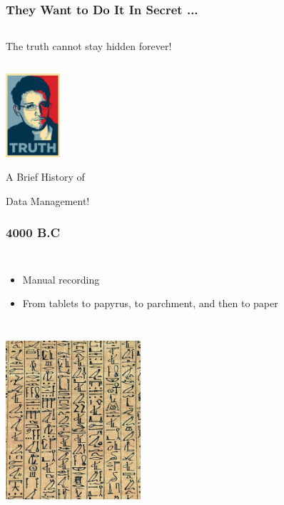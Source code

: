 \documentclass{beamer}
\begin{document}
\begin{frame}
\frametitle{They Want to Do It In Secret ...}
\begin{columns}
\column{17em}
\vspace{2cm}
\begin{block}{}
\centering
The truth cannot stay hidden forever!
\end{block}
\end{columns}
\vspace{.75cm}
\hspace*{9cm}\includegraphics[width=2cm]{figs/snowden.pdf}
\end{frame}

\begin{frame}
\vspace{1cm}
\Huge{\centerline{A Brief History of}}
\Huge{\centerline{Data Management!}}
\end{frame}

\begin{frame}
\frametitle{4000 B.C}
\begin{columns}[c] 
\column{30em}
\begin{itemize}
  \justifying
  \item Manual recording
  \item From tablets to papyrus, to parchment, and then to paper
\end{itemize}
\end{columns}
\vspace{0.5cm}
\hspace*{3.5cm}\includegraphics[width=5cm]{figs/egyptian.pdf}
\end{frame}
\end{document}
